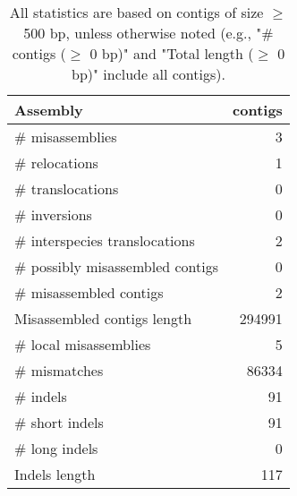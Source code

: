 \documentclass[12pt,a4paper]{article}
\begin{document}
\begin{table}[ht]
\begin{center}
\caption{All statistics are based on contigs of size $\geq$ 500 bp, unless otherwise noted (e.g., "\# contigs ($\geq$ 0 bp)" and "Total length ($\geq$ 0 bp)" include all contigs).}
\begin{tabular}{|l*{1}{|r}|}
\hline
Assembly & contigs \\ \hline
\# misassemblies & 3 \\ \hline
\hspace{5mm}\# relocations & 1 \\ \hline
\hspace{5mm}\# translocations & 0 \\ \hline
\hspace{5mm}\# inversions & 0 \\ \hline
\hspace{5mm}\# interspecies translocations & 2 \\ \hline
\# possibly misassembled contigs & 0 \\ \hline
\# misassembled contigs & 2 \\ \hline
Misassembled contigs length & 294991 \\ \hline
\# local misassemblies & 5 \\ \hline
\# mismatches & 86334 \\ \hline
\# indels & 91 \\ \hline
\hspace{5mm}\# short indels & 91 \\ \hline
\hspace{5mm}\# long indels & 0 \\ \hline
Indels length & 117 \\ \hline
\end{tabular}
\end{center}
\end{table}
\end{document}
